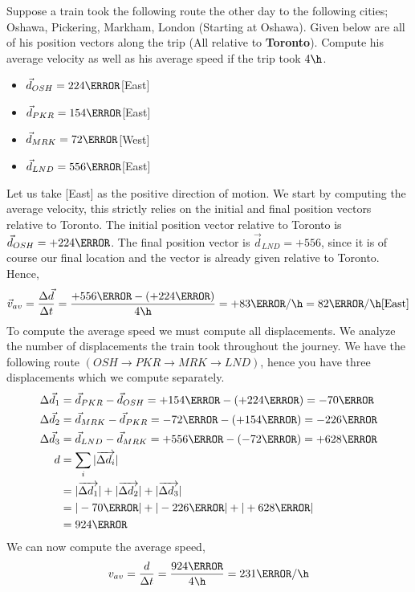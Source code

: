 \documentclass[12pt]{article} %
\newcommand{\tx}[1]{\text{#1}}
\begin{document}
\begin{qstn}[6]
	Suppose a train took the following route the other day to the following cities; Oshawa, Pickering, Markham, London (Starting at Oshawa). Given below are all of his position vectors along the trip (All relative to \textbf{Toronto}). Compute his average velocity as well as his average speed if the trip took $4 \h$.
	\begin{itemize}
	\item $\vec d_{OSH} = 224\km$[East]
	\item $\vec d_{PKR} = 154\km$[East]
	\item $\vec d_{MRK} = 72\km$[West]
	\item $\vec d_{LND} = 556\km$[East]
	\end{itemize}

	\begin{soln}
		Let us take [East] as the positive direction of motion. We start by computing the average velocity, this strictly relies on the initial and final position vectors relative to Toronto. The initial position vector relative to Toronto is $\vec d_{OSH} = +224\km$. The final position vector is $\vec d_{LND} = +556$, since it is of course our final location and the vector is already given relative to Toronto. Hence,
		$$\vec v_{av} = \frac{\Delta \vec d}{\Delta t} = \frac{+556 \km - (+224\km)}{4\h} = +83 \km / \h = 82 \km / \h \tx{[East]}$$
		To compute the average speed we must compute all displacements. We analyze the number of displacements the train took throughout the journey. We have the following route $(OSH \rightarrow PKR \rightarrow MRK \rightarrow LND)$, hence you have three displacements which we compute separately.
		\begin{align*}
			\Delta \vec d_1 &= \vec d_{PKR} - \vec d_{OSH} = +154\km - (+224\km) = -70\km\\
			\Delta \vec d_2 &= \vec d_{MRK} - \vec d_{PKR} = -72\km - (+154\km) = -226\km\\
			\Delta \vec d_3 &= \vec d_{LND} - \vec d_{MRK} = +556\km - (-72\km) = +628\km\\
			d &= \sum_i |\overrightarrow{\Delta d_i}|\\
			&= |\overrightarrow{\Delta d_1}| + |\overrightarrow{\Delta d_2}| + |\overrightarrow{\Delta d_3}|\\
			&= |-70 \km| + |-226\km| + |+628\km|\\
			&= 924\km
		\end{align*}
		We can now compute the average speed,
		$$v_{av} = \frac{d}{\Delta t} = \frac{924 \km}{4\h} = 231 \km / \h$$

	\end{soln}

\end{qstn}
\end{document}
